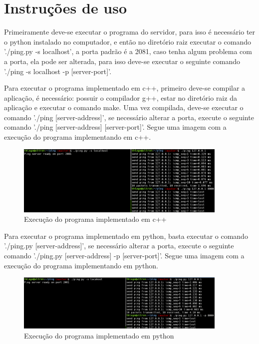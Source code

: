 \section{Instruções de uso}

    Primeiramente deve-se executar o programa do servidor, para isso é
    necessário ter o python instalado no computador, e então no diretório raiz
    executar o comando './ping.py -s localhost', a porta padrão é a 2081,
    caso tenha algum problema com a porta, ela pode ser alterada, para isso
    deve-se executar o seguinte comando './ping -s localhost -p [server-port]'.

    Para executar o programa implementado em c++, primeiro deve-se compilar a
    aplicação, é necessário: possuir o compilador g++, estar no diretório raiz
    da aplicação e executar o comando make. Uma vez compilada, deve-se executar
    o comando './ping [server-address]', se necessário alterar a porta, execute
    o seguinte comando './ping [server-address] [server-port]'. Segue uma imagem
    com a execução do programa implementando em c++.

        \begin{figure}[h!]
            \centering
            \includegraphics[width=0.9\textwidth]{figuras/captura2.eps}
            \caption{Execução do programa implementado em c++}
        \end{figure}

    Para executar o programa implementado em python, basta executar o comando
    './ping.py [server-address]', se necessário alterar a porta, execute o
    seguinte comando './ping.py [server-address] -p [server-port]'. Segue uma
    imagem com a execução do programa implementando em python.

        \begin{figure}[h!]
            \centering
            \includegraphics[width=0.9\textwidth]{figuras/captura1.eps}
            \caption{Execução do programa implementado em python}
        \end{figure}

